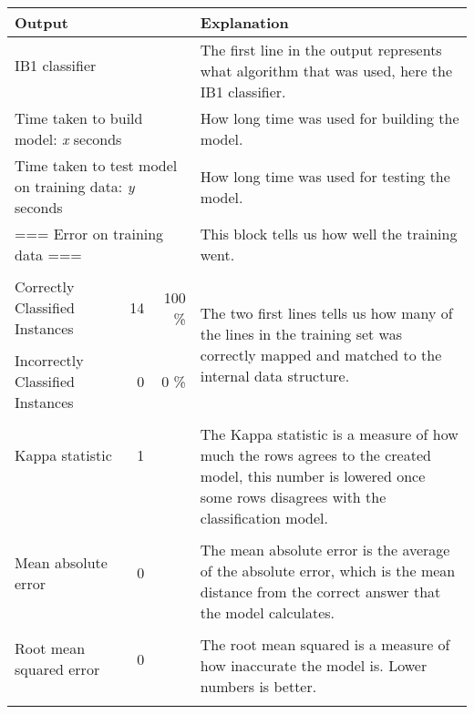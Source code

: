 \documentclass[english,a4paper]{article}
\begin{document}
\begin{longtable}{|lrr|l|}
\hline
\textbf{Output} &&& \textbf{Explanation}\\
\hline
IB1 classifier	&&& \multirow{2}{210pt}{The first line in the output represents
what algorithm that was used, here the IB1 classifier.}
\\
&&&\\
\hline
\multicolumn{3}{|l|}{Time taken to build model: \emph{x} seconds}& How long time
was used for building the model.\\
\hline
\multicolumn{3}{|l|}{Time taken to test model on training data:  \emph{y}
seconds}& How long time was used for testing the model.\\
\hline
\multicolumn{3}{|l|}{=== Error on training data ===}&
This block tells us how well the training went.\\
&&&\\
Correctly Classified Instances&          14 &             100     
\%&\multirow{3}{210pt}{ The two first lines tells us how many of the lines in
the training set was correctly mapped and matched to the internal data
structure.
}\\
&&&\\
Incorrectly Classified Instances&         0 &               0      \%&\\
&&&\\
Kappa statistic                  &        1 &    &\multirow{4}{210pt}{
The Kappa statistic is a measure of how much the rows agrees to the
created model, this number is lowered once some rows disagrees with the
classification model.}
\\
&&&\\
&&&\\
&&&\\
&&&\\
Mean absolute error              &        0  &   &\multirow{3}{210pt}{
The mean absolute error is the average of the absolute error, which is the mean
distance from the correct answer that the model calculates.}\\
&&&\\
&&&\\
&&&\\
Root mean squared error          &        0  &   &\multirow{3}{210pt}{
The root mean squared is a measure of how inaccurate the model is. Lower
numbers is better.}\\
&&&\\
&&&\\
&&&\\

\end{longtable}
\end{document}
